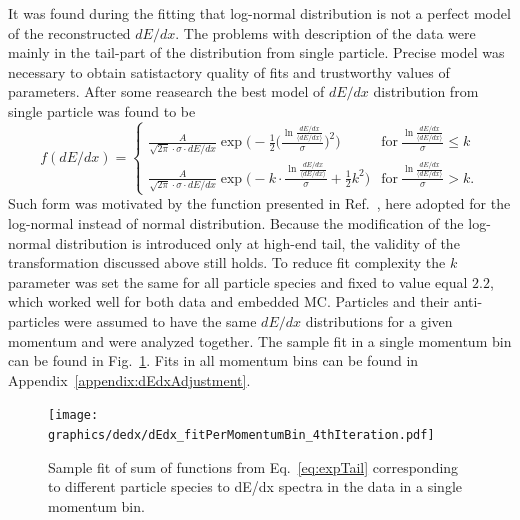 It was found during the fitting that log-normal distribution is not a perfect model of the reconstructed $dE/dx$. The problems with description of the data were mainly in the tail-part of the distribution from single particle. Precise model was necessary to obtain satistactory quality of fits and trustworthy values of parameters. After some reasearch the best model of $dE/dx$ distribution from single particle was found to be%
%
\begin{equation}\label{eq:expTail}
	f(dE/dx)=\left\{
                \begin{array}{ll}
                  \frac{A}{\sqrt{2\pi}\cdot \sigma\cdot dE/dx}\exp{\Bigg(-\frac{1}{2}\Big(\frac{\ln{\frac{dE/dx}{\langle dE/dx\rangle}}}{\sigma}\Big)^{2}\Bigg)} & \textrm{for}~\frac{\ln{\frac{dE/dx}{\langle dE/dx\rangle}}}{\sigma} \leq k \\
                  \frac{A}{\sqrt{2\pi}\cdot \sigma\cdot dE/dx}\exp{\Bigg(-k\cdot \frac{\ln{\frac{dE/dx}{\langle dE/dx\rangle}}}{\sigma} + \frac{1}{2}k^{2} \Bigg)} & \textrm{for}~\frac{\ln{\frac{dE/dx}{\langle dE/dx\rangle}}}{\sigma} > k.
                \end{array}
              \right.
\end{equation}%
%
Such form was motivated by the function presented in Ref.~\cite{AlternativeToCrystallBall}, here adopted for the log-normal instead of normal distribution. Because the modification of the log-normal distribution is introduced only at high-end tail, the validity of the transformation discussed above still holds. To reduce fit complexity the $k$ parameter was set the same for all particle species and fixed  to value equal $2.2$, which worked well for both data and embedded MC. Particles and their anti-particles were assumed to have the same $dE/dx$ distributions for a given momentum and were analyzed together. The sample fit in a single momentum bin can be found in Fig.~\ref{fig:dEdxFit}. Fits in all momentum bins can be found in Appendix~\ref{appendix:dEdxAdjustment}.
%
%
\begin{figure}[ht!]%
\centering%
\texttt{[image: graphics/dedx/dEdx\_fitPerMomentumBin\_4thIteration.pdf]}\vspace{-5pt}%
\caption[Sample fit to dE/dx spectrum in the data in single momentum bin.]%
{Sample fit of sum of functions from Eq.~\eqref{eq:expTail} corresponding to different particle species to dE/dx spectra in the data in a single momentum bin.}\label{fig:dEdxFit}\vspace{10pt}
\end{figure}

